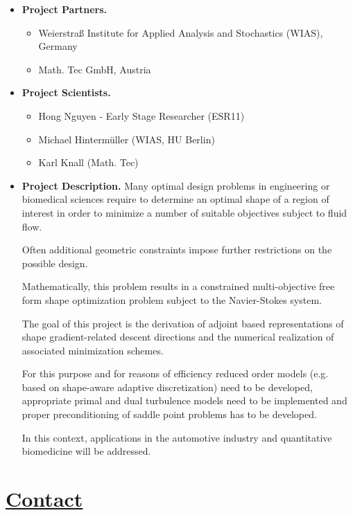 \documentclass[onsided]{book}
\numberwithin{equation}{section}
\begin{document}
\begin{itemize}
    \item \textbf{Project Partners.}
    \begin{itemize}
        \item Weierstraß Institute for Applied Analysis and Stochastics (WIAS), Germany
        \item Math. Tec GmbH, Austria
    \end{itemize}
    \item \textbf{Project Scientists.}
    \begin{itemize}
        \item Hong Nguyen - Early Stage Researcher (ESR11)
        \item Michael Hintermüller (WIAS, HU Berlin)
        \item Karl Knall (Math. Tec)
    \end{itemize}
    \item \textbf{Project Description.} Many optimal design problems in engineering or biomedical sciences require to determine an optimal shape of a region of interest in order to minimize a number of suitable objectives subject to fluid flow.
    
    Often additional geometric constraints impose further restrictions on the possible design.
    
    Mathematically, this problem results in a constrained multi-objective free form shape optimization problem subject to the Navier-Stokes system.
    
    The goal of this project is the derivation of adjoint based representations of shape  gradient-related descent directions and the numerical realization of associated minimization schemes.
    
    For this purpose and for reasons of efficiency reduced order models (e.g. based on shape-aware adaptive discretization) need to be developed, appropriate primal and dual turbulence models need to be implemented and proper preconditioning of saddle point problems has to be developed.
    
    In this context, applications in the automotive industry and quantitative biomedicine will be addressed.
\end{itemize}


\chapter{\href{https://www.romsoc.eu/contact/}{Contact}}
\end{document}
